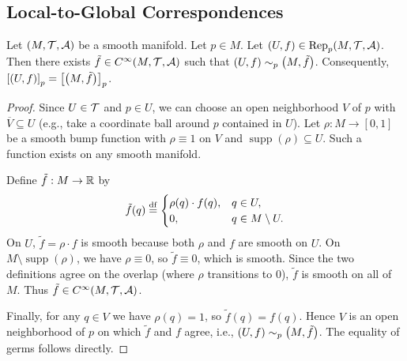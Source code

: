 \documentclass[11pt,reqno]{amsart}
\newcommand{\Rep}{\mathrm{Rep}}
\begin{document}
\subsection{Local-to-Global Correspondences}
\begin{lemma}\label{lem:germ-extension}
Let $(M,\mathcal{T},\mathcal{A})$ be a smooth manifold. Let $p\in M$.
Let $(U,f)\in\Rep_p(M,\T,\A)$.
Then there exists $\tilde f\in C^\infty(M,\mathcal{T},\mathcal{A})$ such that
$(U,f)\sim_p\Br{M,\tilde f}$. Consequently,
${\SqBr{(U,f)}}_p=\SqBr{\Br{M,\tilde f}}_p$.
\end{lemma}
\begin{proof}
Since $U\in\mathcal{T}$ and $p\in U$, we can choose an open neighborhood $V$ of $p$
with $\overline V\subseteq U$ (e.g., take a coordinate ball around $p$
contained in $U$).  Let $\rho:M\to[0,1]$ be a smooth bump function with
$\rho\equiv 1$ on $V$ and $\operatorname{supp}(\rho)\subseteq U$.
Such a function exists on any smooth manifold.

Define $\tilde f:M\to\mathbb{R}$ by
\[
\tilde f(q)\stackrel{\mathrm{df}}{=}\begin{cases}
\rho(q)\cdot f(q),&q\in U,\\
0,&q\in M\setminus U.
\end{cases}
\]
On $U$, $\tilde f=\rho\cdot f$ is smooth because both $\rho$ and $f$ are
smooth on $U$.  On $M\setminus\operatorname{supp}(\rho)$, we have $\rho\equiv 0$, so
$\tilde f\equiv 0$, which is smooth.  Since the two definitions agree on the
overlap (where $\rho$ transitions to $0$), $\tilde f$ is smooth on all of
$M$.  Thus $\tilde f\in C^\infty(M,\mathcal{T},\mathcal{A})$.

Finally, for any $q\in V$ we have $\rho(q)=1$, so
$\tilde f(q)=f(q)$.  Hence $V$ is an open neighborhood of $p$ on which
$\tilde f$ and $f$ agree, i.e., $(U,f)\sim_p\Br{M,\tilde f}$.
The equality of germs follows directly.
\end{proof}
\end{document}
